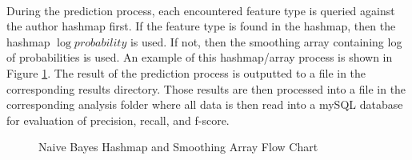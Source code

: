	\paragraph{}During the prediction process, each encountered feature type is queried against the author hashmap first.  If the feature type is found in the hashmap, then the hashmap $\log{probability}$ is used.  If not, then the smoothing array containing log of probabilities is used.  An example of this hashmap/array process is shown in Figure \ref{fig:predictionFlowChart}. The result of the prediction process is outputted to a file in the corresponding results directory.  Those results are then processed into a file in the corresponding analysis folder where all data is then read into a mySQL database for evaluation of precision, recall, and f-score.
		\begin{figure}[ht!]
			\begin{center}
				\caption{Naive Bayes Hashmap and Smoothing Array Flow Chart}
				\label{fig:predictionFlowChart}
			\end{center}
		\end{figure}

